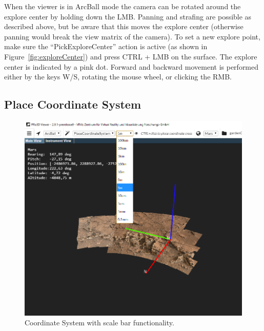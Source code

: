 When the viewer is in ArcBall mode the camera can be rotated around the explore center by holding down the LMB. Panning and strafing are possible as described above, but be aware that this moves the explore center (otherwise panning would break the view matrix of the camera). To set a new explore point, make sure the ``PickExploreCenter'' action is active (as shown in Figure~\ref{fig:exploreCenter}) and press CTRL + LMB on the surface. The explore center is indicated by a pink dot. Forward and backward movement is performed either by the keys W/S, rotating the mouse wheel, or clicking the RMB.
\subsection{Place Coordinate System}
\label{sec:placeCS}

\begin{figure}[h]
    	\centering
    		\includegraphics[width=1\textwidth]{pics/CoordinateSystem.png}
    	\caption[Coordinate System]{Coordinate System with scale bar functionality.}
    	\label{fig:coordinateSystem}
   \end{figure}
	
